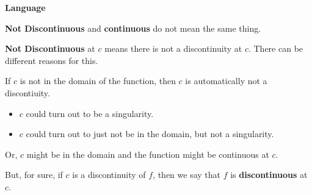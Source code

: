 \documentclass{ximera}
\begin{document}
\begin{idea} \textbf{\textcolor{blue!55!black}{Language}}  


\textbf{Not Discontinuous} and \textbf{continuous} do not mean the same thing. 

\textbf{Not Discontinuous} at $c$ means there is not a discontinuity at $c$.  There can be different reasons for this. 

If $c$ is not in the domain of the function, then $c$ is automatically not a discontiuity.  
\begin{itemize}
     \item $c$ could turn out to be a singularity.  
     \item $c$ could turn out to just not be in the domain, but not a singularity.
\end{itemize}

Or, $c$ might be in the domain and the function might be continuous at $c$.

\end{idea}



But, for sure, if $c$ is a discontinuity of $f$, then we say that $f$ is \textbf{discontinuous} at $c$.
\end{document}
